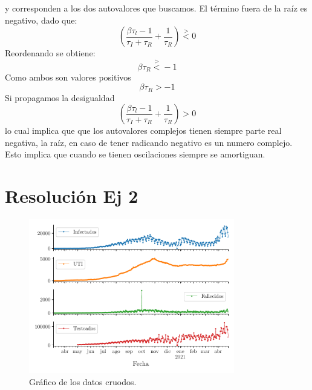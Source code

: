 \documentclass[twocolumn,aps,prl]{revtex4-1}
\begin{document}


y corresponden a los dos autovalores que buscamos. El término fuera de la raíz es negativo, dado que:
$$
\left(\frac{\beta \tau_{l}-1}{\tau_{I}+\tau_{R}}+\frac{1}{\tau_{R}}\right) 
\stackrel{>}{<} 0
$$
Reordenando se obtiene:
$$
\beta \tau_{R}
\stackrel{>}{<} -1
$$
Como ambos son valores positivos 
$$
\beta \tau_{R}
> -1
$$
Si propagamos la desigualdad
$$
\left(\frac{\beta \tau_{l}-1}{\tau_{I}+\tau_{R}}+\frac{1}{\tau_{R}}\right) 
> 0
$$
lo cual implica que que los autovalores complejos tienen siempre parte real negativa, la raíz, en caso de tener radicando negativo es un numero complejo. Esto implica que cuando se tienen oscilaciones siempre se amortiguan. 

\section{Resolución Ej 2}

\begin{figure}[!ht]
  \centering
    \includegraphics[width = 0.8\textwidth]{figuras/ex02-resumen.pdf}
    \caption{Gráfico de los datos cruodos.}
    \label{fig:ex02Resumen}
\end{figure}
\end{document}
